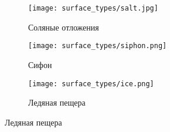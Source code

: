\begin{figure}[ht]
    \begin{subfigure}[b]{0.3\textwidth}
        \centering\texttt{[image: surface\_types/salt.jpg]}\\
        \caption{Соляные отложения}
        \label{fig:surface_types/salt}
    \end{subfigure}
    \hfill
    \begin{subfigure}[b]{0.3\textwidth}
        \centering\texttt{[image: surface\_types/siphon.png]}\\
        \caption{Сифон}
        \label{fig:surface_types/siphon}
    \end{subfigure}
    \hfill
    \begin{subfigure}[b]{0.3\textwidth}
        \centering\texttt{[image: surface\_types/ice.png]}\\
        \caption{Ледяная пещера}
        \label{fig:surface_types/ice}
    \end{subfigure}
  

\end{figure}
